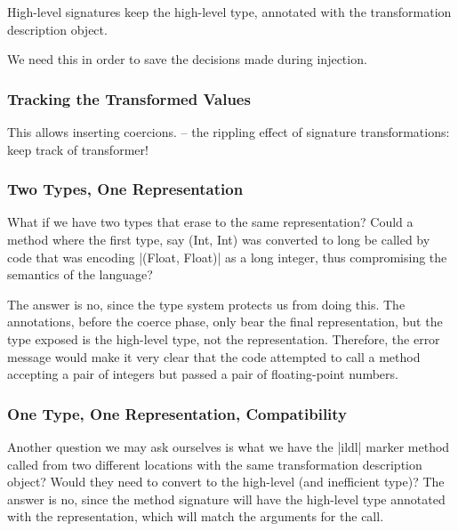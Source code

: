 High-level signatures keep the high-level type, annotated with the transformation description object.

We need this in order to save the decisions made during injection.

\subsubsection{Tracking the Transformed Values}
This allows inserting coercions.
 -- the rippling effect of signature transformations: keep track of transformer!

\subsubsection{Two Types, One Representation}

What if we have two types that erase to the same representation? Could a method where the first type, say (Int, Int) was converted to long be called by code that was encoding |(Float, Float)| as a long integer, thus compromising the semantics of the language?

The answer is no, since the type system protects us from doing this. The annotations, before the coerce phase, only bear the final representation, but the type exposed is the high-level type, not the representation. Therefore, the error message would make it very clear that the code attempted to call a method accepting a pair of integers but passed a pair of floating-point numbers.

\subsubsection{One Type, One Representation, Compatibility}

Another question we may ask ourselves is what we have the |ildl| marker method called from two different locations with the same transformation description object? Would they need to convert to the high-level (and inefficient type)? The answer is no, since the method signature will have the high-level type annotated with the representation, which will match the arguments for the call.

